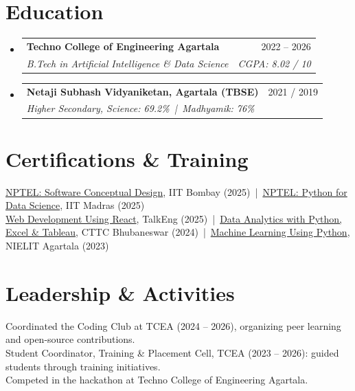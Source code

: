 \documentclass[a4paper,11pt]{article}
\makeatletter
\newcommand{\resumeSubheading}[4]{
  \vspace{-2pt}\item
  \begin{tabular*}{\textwidth}[t]{l@{\extracolsep{\fill}}r}
    \textbf{#1} & \small #2 \\
    \textit{\small #3} & \textit{\small #4} \\
  \end{tabular*}\vspace{-7pt}}
\newcommand{\resumeSubHeadingListStart}{\begin{itemize}[leftmargin=0.0in, label={}]}
\newcommand{\resumeSubHeadingListEnd}{\end{itemize}}
\makeatother
\begin{document}
\section{Education}
\resumeSubHeadingListStart
  \resumeSubheading
    {Techno College of Engineering Agartala}{2022 -- 2026}
    {B.Tech in Artificial Intelligence \& Data Science}{CGPA: 8.02 / 10}
  \resumeSubheading
    {Netaji Subhash Vidyaniketan, Agartala (TBSE)}{2021 / 2019}
    {Higher Secondary, Science: 69.2\% \,|\, Madhyamik: 76\%}{}
\resumeSubHeadingListEnd

\section{Certifications \& Training}
\resumeSubHeadingListStart
  \small{\item{
    \href{https://drive.google.com/file/d/1QlXVrJTUkSpy14A6CNf3HGMVMeh0y0V9/view?usp=drive_link}{NPTEL: Software Conceptual Design}, IIT Bombay (2025) \,|\,
    \href{https://drive.google.com/file/d/1R7ZJVjkQcOVw6-SvEsVM7cFPY6zVg0Uy/view?usp=sharing}{NPTEL: Python for Data Science}, IIT Madras (2025) \\
    \href{https://drive.google.com/file/d/1YVz8l7VpvOiUarQ7bdoPfNhR0s01-qUE/view?usp=sharing}{Web Development Using React}, TalkEng (2025) \,|\,
    \href{https://drive.google.com/file/d/1Xyqi6YAE6VhoMIPlak_2jPTphff76zkk/view?usp=sharing}{Data Analytics with Python, Excel \& Tableau}, CTTC Bhubaneswar (2024) \,|\,
    \href{https://drive.google.com/file/d/10ldy14oSgxGBUeByLLU4DSJHBwcoG3_K/view?usp=sharing}{Machine Learning Using Python}, NIELIT Agartala (2023)
  }}
\resumeSubHeadingListEnd

\section{Leadership \& Activities}
\resumeSubHeadingListStart
  \small{\item{
    Coordinated the Coding Club at TCEA (2024 -- 2026), organizing peer learning and open-source contributions. \\
    Student Coordinator, Training \& Placement Cell, TCEA (2023 -- 2026): guided students through training initiatives. \\
    Competed in the hackathon at Techno College of Engineering Agartala.
  }}
\resumeSubHeadingListEnd
\end{document}
